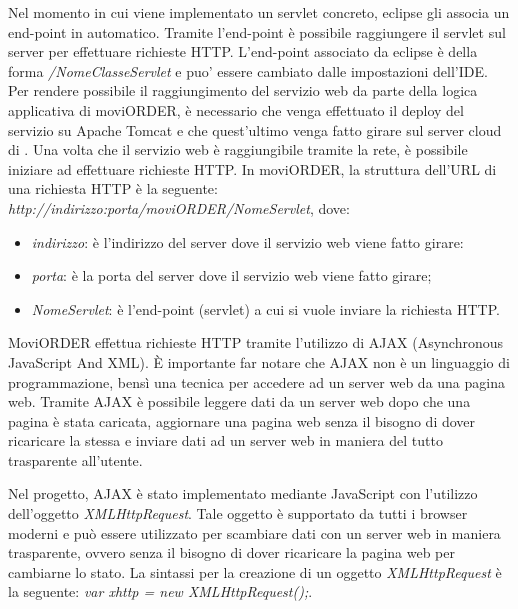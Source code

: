 Nel momento in cui viene implementato un servlet concreto, eclipse gli associa un end-point in automatico. Tramite l'end-point è possibile raggiungere il servlet sul server per effettuare richieste HTTP. L'end-point associato da eclipse è della forma \textit{/NomeClasseServlet} e puo' essere cambiato dalle impostazioni dell'IDE. Per rendere possibile il raggiungimento del servizio web da parte della logica applicativa di moviORDER, è necessario che venga effettuato il deploy del servizio su Apache Tomcat e che quest'ultimo venga fatto girare sul server cloud di \visione{}. Una volta che il servizio web è raggiungibile tramite la rete, è possibile iniziare ad effettuare richieste HTTP. In moviORDER, la struttura dell'URL di una richiesta HTTP è la seguente: \textit{http://indirizzo:porta/moviORDER/NomeServlet}, dove:
\begin{itemize}
	\item \textit{indirizzo}: è l'indirizzo del server dove il servizio web viene fatto girare:
	\item \textit{porta}: è la porta del server dove il servizio web viene fatto girare;
	\item \textit{NomeServlet}: è l'end-point (servlet) a cui si vuole inviare la richiesta HTTP.
\end{itemize}

MoviORDER effettua richieste HTTP tramite l'utilizzo di AJAX (Asynchronous JavaScript And XML). È importante far notare che AJAX non è un linguaggio di programmazione, bensì una tecnica per accedere ad un server web da una pagina web. Tramite AJAX è possibile leggere dati da un server web dopo che una pagina è stata caricata, aggiornare una pagina web senza il bisogno di dover ricaricare la stessa e inviare dati ad un server web in maniera del tutto trasparente all'utente. 

Nel progetto, AJAX è stato implementato mediante JavaScript con l'utilizzo dell'oggetto \textit{XMLHttpRequest}. Tale oggetto è supportato da tutti i browser moderni e può essere utilizzato per scambiare dati con un server web in maniera trasparente, ovvero senza il bisogno di dover ricaricare la pagina web per cambiarne lo stato. La sintassi per la creazione di un oggetto \textit{XMLHttpRequest} è la seguente:
\textit{var xhttp = new XMLHttpRequest();}. 

